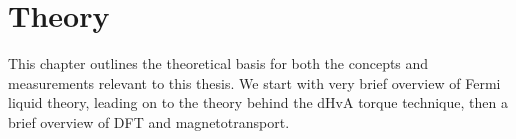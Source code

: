 \chapter{Theory}

\begin{chapterabstract}
This chapter outlines the theoretical basis for both the concepts and measurements relevant to this thesis. We start with very brief overview of Fermi liquid theory, leading on to the theory behind the \ac{dHvA} torque technique, then a brief overview of \ac{DFT} and magnetotransport.
\end{chapterabstract}













